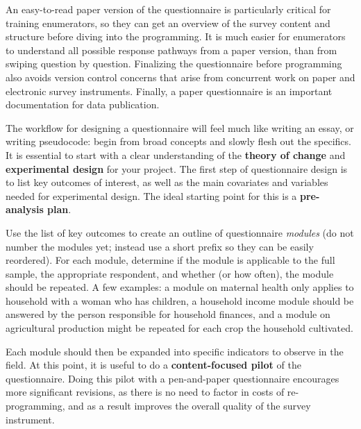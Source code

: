 An easy-to-read paper version of the questionnaire is particularly critical for training enumerators, so they can get an overview of the survey content and structure before diving into the programming. 
It is much easier for enumerators to understand all possible response pathways from a paper version, than from swiping question by question. 
Finalizing the questionnaire before programming also avoids version control concerns that arise from concurrent work on paper and electronic survey instruments. 
Finally, a paper questionnaire is an important documentation for data publication. 

The workflow for designing a questionnaire will feel much like writing an essay, or writing pseudocode: begin from broad concepts and slowly flesh out the specifics. It is essential to start with a clear understanding of the 
\textbf{theory of change}  and \textbf{experimental design} for your project.
The first step of questionnaire design is to list key outcomes of interest, as well as the main covariates and variables needed for experimental design. 
The ideal starting point for this is a \textbf{pre-analysis plan}. 

Use the list of key outcomes to create an outline of questionnaire \textit{modules} (do not number the modules yet; instead use a short prefix so they can be easily reordered). For each module, determine if the module is applicable to the full sample, the appropriate respondent, and whether (or how often), the module should be repeated. A few examples: a module on maternal health only applies to household with a woman who has children, a household income module should be answered by the person responsible for household finances, and a module on agricultural production might be repeated for each crop the household cultivated. 

Each module should then be expanded into specific indicators to observe in the field. 
At this point, it is useful to do a  \textbf{content-focused pilot}  of the questionnaire. 
Doing this pilot with a pen-and-paper questionnaire encourages more significant revisions, as there is no need to factor in costs of re-programming, and as a result improves the overall quality of the survey instrument. 

